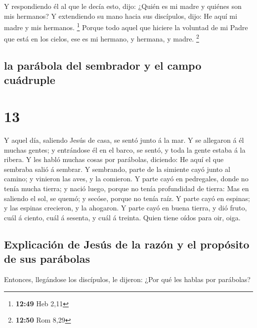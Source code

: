  Y respondiendo él al que le decía esto, dijo: ¿Quién es
mi madre y quiénes son mis hermanos?  Y extendiendo su
mano hacia sus discípulos, dijo: He aquí mi madre y mis hermanos.
\footnote{\textbf{12:49} Heb 2,11}  Porque todo aquel que
hiciere la voluntad de mi Padre que está en los cielos, ese es mi
hermano, y hermana, y madre. \footnote{\textbf{12:50} Rom 8,29}

\hypertarget{la-paruxe1bola-del-sembrador-y-el-campo-cuuxe1druple}{%
\subsection{la parábola del sembrador y el campo
cuádruple}\label{la-paruxe1bola-del-sembrador-y-el-campo-cuuxe1druple}}

\hypertarget{section-12}{%
\section{13}\label{section-12}}

 Y aquel día, saliendo Jesús de casa, se sentó junto á la
mar.  Y se allegaron á él muchas gentes; y entrándose él
en el barco, se sentó, y toda la gente estaba á la ribera.
 Y les habló muchas cosas por parábolas, diciendo: He aquí
el que sembraba salió á sembrar.  Y sembrando, parte de la
simiente cayó junto al camino; y vinieron las aves, y la comieron.
 Y parte cayó en pedregales, donde no tenía mucha tierra;
y nació luego, porque no tenía profundidad de tierra:  Mas
en saliendo el sol, se quemó; y secóse, porque no tenía raíz.
 Y parte cayó en espinas; y las espinas crecieron, y la
ahogaron.  Y parte cayó en buena tierra, y dió fruto, cuál
á ciento, cuál á sesenta, y cuál á treinta.  Quien tiene
oídos para oir, oiga.

\hypertarget{explicaciuxf3n-de-jesuxfas-de-la-razuxf3n-y-el-propuxf3sito-de-sus-paruxe1bolas}{%
\subsection{Explicación de Jesús de la razón y el propósito de sus
parábolas}\label{explicaciuxf3n-de-jesuxfas-de-la-razuxf3n-y-el-propuxf3sito-de-sus-paruxe1bolas}}

 Entonces, llegándose los discípulos, le dijeron: ¿Por
qué les hablas por parábolas?


